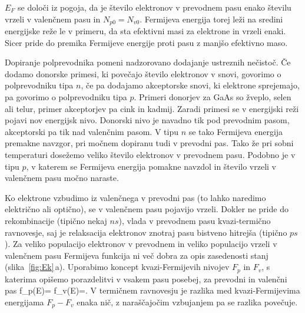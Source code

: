 \begin{remark}
$E_F$ se določi iz pogoja, da je število elektronov v prevodnem pasu enako 
številu vrzeli v valenčnem pasu in $N_{p0} = N_{v0}$. Fermijeva energija
torej leži na sredini energijske reže le v primeru, da sta efektivni masi 
za elektrone in vrzeli enaki. Sicer pride do premika Fermijeve energije 
proti pasu z manjšo efektivno maso. 
\end{remark}


Dopiranje polprevodnika pomeni nadzorovano dodajanje ustreznih nečistoč. 
Če dodamo donorske primesi, ki povečajo število elektronov v snovi, 
govorimo o polprevodniku tipa $n$, če pa dodajamo akceptorske snovi, ki 
elektrone sprejemajo, pa govorimo o polprevodniku tipa $p$. 
Primeri donorjev za GaAs so žveplo, selen ali telur,
primer akceptorjev pa cink in kadmij. Zaradi primesi se v energijski 
reži pojavi nov energijsk nivo. Donorski nivo je navadno tik pod prevodnim 
pasom, akceptorski pa tik nad valenčnim pasom. V tipu $n$ se tako Fermijeva 
energija premakne navzgor, pri močnem dopiranu tudi v prevodni pas. Tako že 
pri sobni temperaturi dosežemo veliko število elektronov v prevodnem pasu. 
Podobno je v tipu $p$, v katerem se Fermijeva energija pomakne navzdol 
in število vrzeli v valenčnem pasu močno naraste. 

Ko elektrone vzbudimo iz valenčnega v prevodni pas (to lahko naredimo 
električno ali optično), se v valenčnem pasu pojavijo
vrzeli. Dokler ne pride do rekombinacije (tipično nekaj $\si{ns}$),
vlada v prevodnem pasu kvazi-termično ravnovesje, saj je relaksacija 
elektronov znotraj pasu bistveno hitrejša (tipično $\si{ps}$). 
Za veliko populacijo elektronov v prevodnem in veliko populacijo vrzeli v 
valenčnem pasu Fermijeva funkcija ni več dobra za opis zasedenosti stanj 
(slika~\ref{fig:Ek}\,a). Uporabimo
koncept kvazi-Fermijevih nivojev $F_p$ in $F_v$, s katerima opišemo porazdelitvi
v vsakem pasu posebej, za prevodni in valenčni pas
\beq
f_p(E)= \quad {} \quad 
f_v(E)=.
\eeq
V termičnem ravnovesju je razlika med kvazi-Fermijevima energijama $F_{p}-F_v$ 
enaka nič, z naraščajočim vzbujanjem pa se razlika povečuje.

